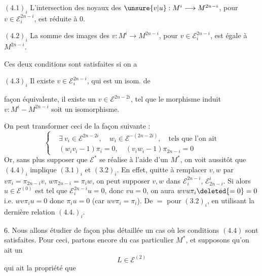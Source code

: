 $(4.1)_i$ L'intersection des noyaux des $\unsure{v|u}:M^i\longrightarrow M^{2n-i}$, pour $v\in\mathcal E_i^{2n-i}$, est réduite à $0$.

$(4.2)_i$ La somme des images des $v:M^i\longrightarrow M^{2n-i}$, pour $v\in\mathcal E_i^{2n-i}$, est  égale à $M^{2n-i}$.

Ces deux conditions sont satisfaites si on a

$(4.3)_i$ Il existe  $v\in\mathcal E_i^{2n-i}$, qui est un isom. de

façon équivalente, il existe un $v\in\mathcal E^{2n-2i}$, tel que le morphisme induit $v:M^i-M^{2n-i}$ soit un isomorphisme.

On peut transformer ceci de la façon suivante :
\[
\left\{\begin{aligned}
&\exists\ v_i\in\mathcal E^{2n-2i},\quad w_i\in\mathcal E^{-(2n-2i)},\quad\text{tels que l'on ait}\\
&(w_iv_i-1)\pi_i=0,\quad(v_iw_i-1)\pi_{2n-i}=0
\end{aligned}\right.
\tag*{$(4.4)_i$}
\]
Or, sans plus supposer que $\mathcal E^*$ se réalise à l'aide d'un $M^*$, on voit aussitôt que $(4.4)_i$ implique $(3.1)_i$ et $(3.2)_i$. En effet, quitte à remplacer $v,w$ par $v\pi_i=\pi_{2n-i}v$, $w\pi_{2n-i}=\pi_iw$, on peut supposer $v,w$ dans $\mathcal E_i^{2n-i}$, $\mathcal E_{2n-i}^i$. Si alors  $u\in\mathcal E^{(0)}$ est tel que $\mathcal E_i^{2n-i}u=0$, donc $vu=0$, on aura $wvu\pi_i\deleted{=0}=0$ i.e. $wv\pi_i u=0$ donc $\pi_i u=0$ (car $wv\pi_i=\pi_i$). De $=$ pour $(3.2)_i$, en utilisant la dernière relation $(4.4.)_i$.


6. Nous allons étudier de façon plus détaillée un cas où les conditions $(4.4)$ sont satisfaites. Pour ceci, partons encore du cas particulier $M^*$,  et supposons qu'on ait un
\[
L\in\mathcal E^{(2)}
\tag{6.0}
\]
qui ait la propriété que

